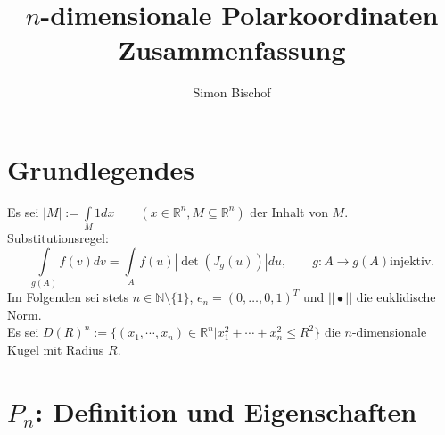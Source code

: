 \documentclass[a4paper,11pt]{scrartcl}
\newcommand{\R}{{\ensuremath{\mathbb{R}}}}
\newcommand{\N}{{\ensuremath{\mathbb{N}}}}
\begin{document}
\pagestyle{empty}
\author{\large Simon Bischof}
\title{{\LARGE $n$-dimensionale Polarkoordinaten} \\ {\large Zusammenfassung}}
\date{}
\maketitle
{}
\section{Grundlegendes}
Es sei $|M|:=\int\limits_M 1dx \qquad (x\in\R^n,M\subseteq \R^n)$ der Inhalt von $M$.\\
Substitutionsregel:
\begin{equation*}
\label{subst}
\int\limits_{g(A)}f(v)dv=\int\limits_A f(u)|\det(J_g(u))| du, \qquad g:A\to g(A) \text{injektiv.}
\end{equation*}
Im Folgenden sei stets $n\in\N\setminus\{1\}$, $e_n=(0,\ldots,0,1)^T$ und $||\bullet||$ die euklidische Norm.\\
Es sei $D(R)^n:=\{(x_1,\cdots,x_n)\in\R^n|x_1^2+\cdots+x_n^2\leq R^2\}$ die $n$-dimensionale Kugel mit Radius $R$.
\section{$P_n$: Definition und Eigenschaften}
\end{document}
